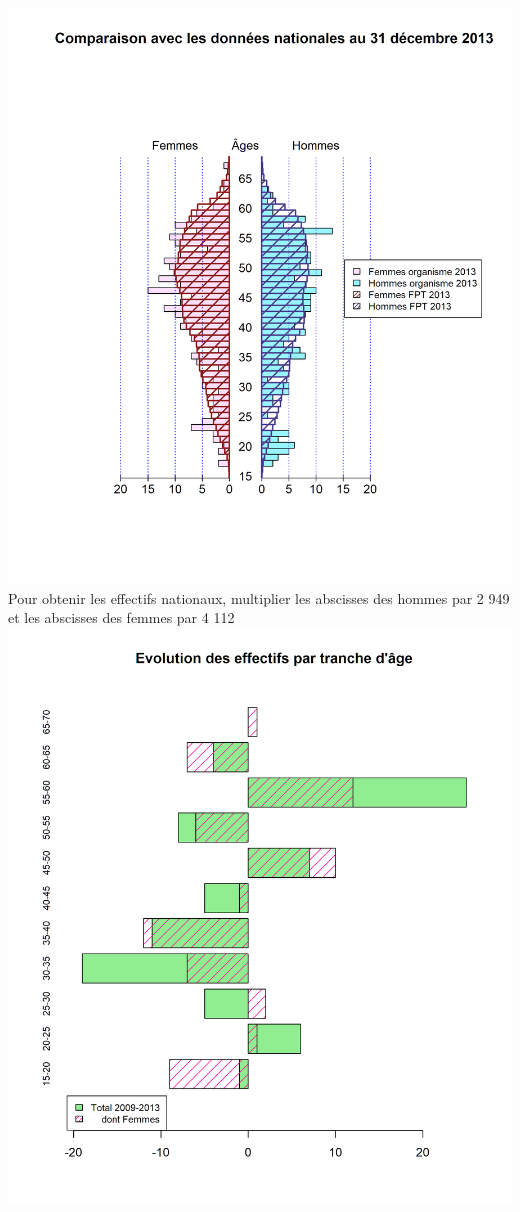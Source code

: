 \includegraphics{altair_files/figure-latex/unnamed-chunk-11-2.png} Pour
obtenir les effectifs nationaux, multiplier les abscisses des hommes par
2 949 et les abscisses des femmes par 4 112\newpage
\includegraphics{altair_files/figure-latex/unnamed-chunk-11-3.png}

